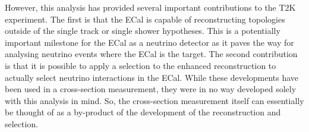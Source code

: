 \newline
\newline
However, this analysis has provided several important contributions to the T2K experiment.  The first is that the ECal is capable of reconstructing topologies outside of the single track or single shower hypotheses.  This is a potentially important milestone for the ECal as a neutrino detector as it paves the way for analysing neutrino events where the ECal is the target.  The second contribution is that it is possible to apply a selection to the enhanced reconstruction to actually select neutrino interactions in the ECal.  While these developments have been used in a cross-section measurement, they were in no way developed solely with this analysis in mind.  So, the cross-section measurement itself can essentially be thought of as a by-product of the development of the reconstruction and selection.

